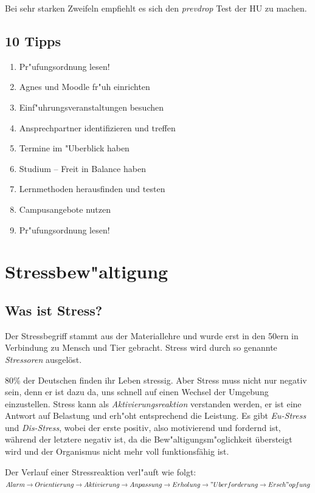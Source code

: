 \documentclass[]{scrartcl}
\begin{document}
Bei sehr starken Zweifeln empfiehlt es sich den \emph{prevdrop} Test der HU zu machen.

\subsection{10 Tipps}

\begin{enumerate}
  \item Pr"ufungsordnung lesen!
  \item Agnes und Moodle fr"uh einrichten
  \item Einf"uhrungsveranstaltungen besuchen
  \item Ansprechpartner identifizieren und treffen
  \item Termine im "Uberblick haben
  \item Studium -- Freit in Balance haben
  \item Lernmethoden herausfinden und testen
  \item Campusangebote nutzen
  \item Pr"ufungsordnung lesen!
\end{enumerate}

\section{Stressbew"altigung}

\subsection{Was ist Stress?}

Der Stressbegriff stammt aus der Materiallehre und wurde erst in den 50ern in Verbindung zu Mensch und Tier gebracht. Stress wird durch so genannte \emph{Stressoren} ausgelöst.

80\% der Deutschen finden ihr Leben stressig. Aber Stress muss nicht nur negativ sein, denn er ist dazu da, uns schnell auf einen Wechsel der Umgebung einzustellen. Stress kann als \emph{Aktivierungsreaktion} verstanden werden, er ist eine Antwort auf Belastung und erh"oht entsprechend die Leistung. Es gibt \emph{Eu-Stress} und \emph{Dis-Stress}, wobei der erste positiv, also motivierend und fordernd ist, während der letztere negativ ist, da die Bew"altigungsm"oglichkeit übersteigt wird und der Organismus nicht mehr voll funktionsfähig ist.

Der Verlauf einer Stressreaktion verl"auft wie folgt: $Alarm \rightarrow Orientierung \rightarrow Aktivierung \rightarrow Anpassung \rightarrow Erholung \rightarrow "Uberforderung \rightarrow Ersch"opfung $
\end{document}
